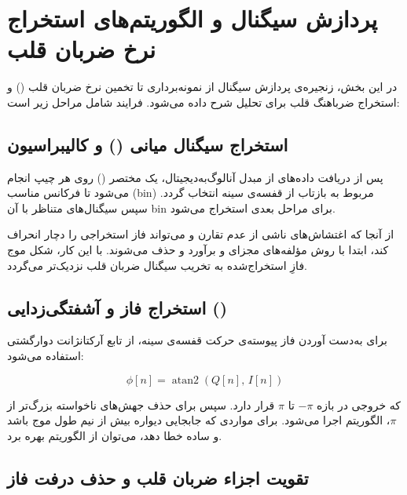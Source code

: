\section{پردازش سیگنال و الگوریتم‌های استخراج نرخ ضربان قلب}
\label{sec:signal-processing-hr-estimation}

در این بخش، زنجیره‌ی پردازش سیگنال از نمونه‌برداری تا تخمین نرخ ضربان قلب () و استخراج ضرباهنگ قلب برای تحلیل  شرح داده می‌شود. فرایند شامل مراحل زیر است:

\subsection{استخراج سیگنال میانی () و کالیبراسیون }
\label{sec:beat-signal-dc-calibration}

پس از دریافت داده‌های  از مبدل آنالوگ‌به‌دیجیتال، یک  مختصر () روی هر چیپ انجام می‌شود تا فرکانس مناسب (bin) مربوط به بازتاب از قفسه‌ی سینه انتخاب گردد. سپس سیگنال‌های  متناظر با آن bin برای مراحل بعدی استخراج می‌شود.

از آنجا که اغتشاش‌های ناشی از عدم تقارن  و  می‌تواند فاز استخراجی را دچار انحراف کند، ابتدا با روش  مؤلفه‌های  مجزای  و  برآورد و حذف می‌شوند. با این کار، شکل موج فازِ استخراج‌شده به تخریب سیگنال ضربان قلب نزدیک‌تر می‌گردد.

\subsection{استخراج فاز و آشفتگی‌زدایی ()}
\label{sec:phase-unwrapping}

برای به‌دست آوردن فاز پیوسته‌ی حرکت قفسه‌ی سینه، از تابع آرکتانژانت دوارگشتی استفاده می‌شود:

\begin{equation}
\phi[n] = \operatorname{atan2}(Q[n],\, I[n])
\label{eq:phase_extraction}
\end{equation}

که خروجی در بازه $-\pi$ تا $\pi$ قرار دارد. سپس برای حذف جهش‌های ناخواسته بزرگ‌تر از $\pi$، الگوریتم  اجرا می‌شود. برای مواردی که جابجایی دیواره بیش از نیم طول موج باشد و  ساده خطا دهد، می‌توان از الگوریتم  بهره برد.

\subsection{تقویت اجزاء ضربان قلب و حذف درفت فاز}
\label{sec:phase-detrend}

